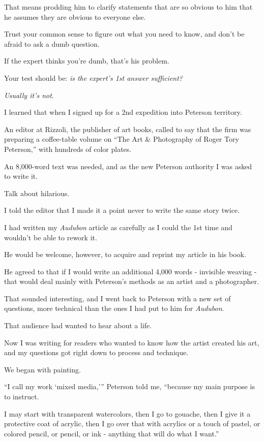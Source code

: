\documentclass{book}
\numberwithin{equation}{section}
\begin{document}
That means prodding him to clarify statements that are so obvious to him that he assumes they are obvious to everyone else.

Trust your common sense to figure out what you need to know, and don't be afraid to ask a dumb question.

If the expert thinks you're dumb, that's his problem.

%
Your test should be: \textit{is the expert's 1st answer sufficient?}

\textit{Usually it's not}.

I learned that when I signed up for a 2nd expedition into Peterson territory.

An editor at Rizzoli, the publisher of art books, called to say that the firm was preparing a coffee-table volume on ``The Art \& Photography of Roger Tory Peterson,'' with hundreds of color plates.

An 8,000-word text was needed, and as the new Peterson authority I was asked to write it.

Talk about hilarious.

I told the editor that I made it a point never to write the same story twice.

I had written my \textit{Audubon} article as carefully as I could the 1st time and wouldn't be able to rework it.

He would be welcome, however, to acquire and reprint my article in his book.

He agreed to that if I would write an additional 4,000 words - invisible weaving - that would deal mainly with Peterson's methods as an artist and a photographer.

%
That sounded interesting, and I went back to Peterson with a new set of questions, more technical than the ones I had put to him for \textit{Audubon}.

That audience had wanted to hear about a life.

Now I was writing for readers who wanted to know how the artist created his art, and my questions got right down to process and technique.

We began with painting.

%
``I call my work `mixed media,''' Peterson told me, ``because my main purpose is to instruct.

I may start with transparent watercolors, then I go to gouache, then I give it a protective coat of acrylic, then I go over that with acrylics or a touch of pastel, or colored pencil, or pencil, or ink - anything that will do what I want.''
\end{document}
